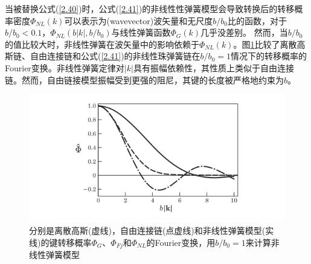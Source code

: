 当被替换公式(\ref{2.40})时，公式(\ref{2.41})的非线性性弹簧模型会导致转换后的转移概率密度$\varPhi_{NL}(k)$可以表示为(wavevector)波矢量和无尺度$b/b_{0}$比的函数，对于$b/b_{0}<0.1$，$\varPhi_{NL}(b|k|,b/b_{0})$与线性弹簧函数$\varPhi_{G}(k)$几乎没差别。 然而，当$b/b_{0}$的值比较大时，非线性弹簧在波矢量中的影响依赖于$\varPhi_{NL}(k)$。图\ref{figures24}比较了离散高斯链、自由连接链和公式(\ref{2.41})的非线性珠弹簧链在$b/b_{0}=1$情况下的转移概率的Fourier变换。非线性弹簧定律对$|k|$具有振幅依赖性，其性质上类似于自由连接链。然而，自由链接模型振幅受到更强的阻尼，其键的长度被严格地约束为$b$。
\begin{figure}[H]
\centering
\includegraphics[width=15cm]{./figures/24.png}
\caption{分别是离散高斯(虚线)，自由连接链(点虚线)和非线性弹簧模型(实线)的键转移概率$\varPhi_{G}$、$\varPhi_{Fj}$和$\varPhi_{NL}$的Fourier变换，用$b/b_{0}=1$来计算非线性弹簧模型}
\label{figures24}
\end{figure}
